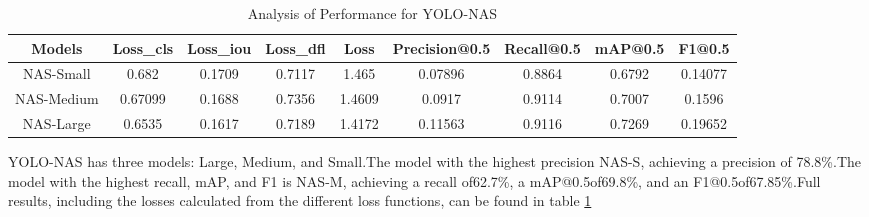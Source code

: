 \begin{table}[!htbp]
    \centering
    \caption{Analysis of Performance for YOLO-NAS}
    \label{tab:my_label}
    \footnotesize
    \begin{tabular}{|c|c|c|c|c|c|c|c|c|}
    \hline
     Models &  Loss\_cls&  Loss\_iou& Loss\_dfl & Loss &  Precision@0.5&  Recall@0.5&  mAP@0.5& F1@0.5\\
    \hline
    NAS-Small&  0.682&  0.1709&  0.7117&  1.465&  0.07896&  0.8864&  0.6792& 0.14077\\
    \hline
    NAS-Medium& 0.67099 &  0.1688&  0.7356&  1.4609& 0.0917 &  0.9114 & 0.7007 & 0.1596\\
    \hline
    NAS-Large& 0.6535 &  0.1617&  0.7189& 1.4172 &  0.11563&  0.9116&  0.7269& 0.19652\\
         \hline
    \end{tabular}
\end{table}
YOLO-NAS has three models: Large, Medium, and Small.The model with the highest precision NAS-S, achieving a precision of 78.8\%.The model with the highest recall, mAP, and F1 is NAS-M, achieving a recall of62.7\%, a mAP@0.5of69.8\%, and an F1@0.5of67.85\%.Full results, including the losses calculated from the different loss functions, can be found in table \ref{tab:my_label}

